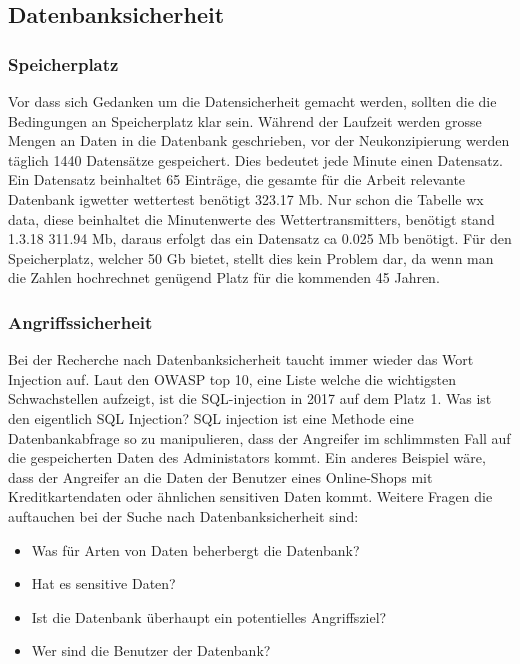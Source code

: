 \subsection{Datenbanksicherheit}
\subsubsection{Speicherplatz}
Vor dass sich Gedanken um die Datensicherheit gemacht werden, sollten die die Bedingungen an Speicherplatz klar sein. Während der Laufzeit werden grosse Mengen an Daten in die Datenbank geschrieben, vor der Neukonzipierung werden täglich 1440 Datensätze gespeichert. Dies bedeutet jede Minute einen Datensatz. Ein Datensatz beinhaltet 65 Einträge, die gesamte für die Arbeit relevante Datenbank igwetter wettertest benötigt 323.17  Mb. Nur schon die Tabelle wx data, diese beinhaltet die Minutenwerte des Wettertransmitters, benötigt stand 1.3.18 311.94 Mb, daraus erfolgt das ein Datensatz ca 0.025 Mb benötigt. Für den Speicherplatz, welcher 50 Gb bietet, stellt dies kein Problem dar, da wenn man die Zahlen hochrechnet genügend Platz für die kommenden 45 Jahren.\\


\subsubsection{Angriffssicherheit}

Bei der Recherche nach Datenbanksicherheit taucht immer wieder das Wort Injection auf. Laut den OWASP top 10, eine Liste welche die wichtigsten Schwachstellen aufzeigt, ist die SQL-injection in 2017 auf dem Platz 1. Was ist den eigentlich SQL Injection? SQL injection ist eine Methode eine Datenbankabfrage so zu manipulieren, dass der Angreifer im schlimmsten Fall auf die gespeicherten Daten des Administators kommt. Ein anderes Beispiel wäre, dass der Angreifer an die Daten der Benutzer eines Online-Shops mit Kreditkartendaten oder ähnlichen sensitiven Daten kommt.
Weitere Fragen die auftauchen bei der Suche nach Datenbanksicherheit sind:
\begin{itemize}
\item Was für Arten von Daten beherbergt die Datenbank?
\item Hat es sensitive Daten?
\item Ist die Datenbank überhaupt ein potentielles Angriffsziel?
\item Wer sind die Benutzer der Datenbank?
\end{itemize}

